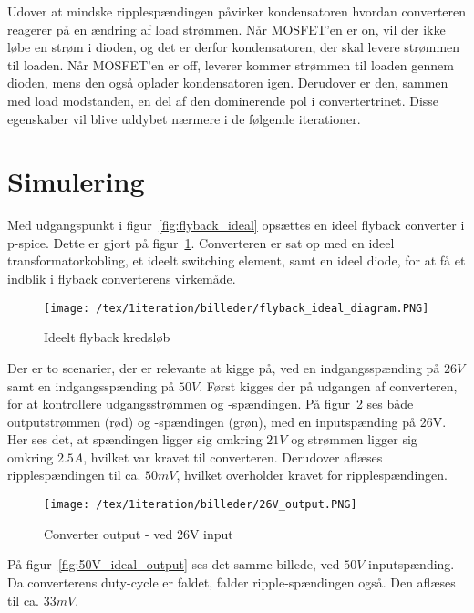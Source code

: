 \noindent Udover at mindske ripplespændingen påvirker kondensatoren hvordan converteren reagerer på en ændring af load strømmen. Når MOSFET'en er on, vil der ikke løbe en strøm i dioden, og det er derfor kondensatoren, der skal levere strømmen til loaden. Når MOSFET'en er off, leverer kommer strømmen til loaden gennem dioden, mens den også oplader kondensatoren igen. Derudover er den, sammen med load modstanden, en del af den dominerende pol i convertertrinet. Disse egenskaber vil blive uddybet nærmere i de følgende iterationer. 

\section{Simulering}
Med udgangspunkt i figur~\ref{fig:flyback_ideal} opsættes en ideel flyback converter i p-spice. Dette er gjort på figur~\ref{fig:ideal_flyback_diagram}. Converteren er sat op med en ideel transformatorkobling, et ideelt switching element, samt en ideel diode, for at få et indblik i flyback converterens virkemåde. 


\begin{figure}[H]
	\center
	\texttt{[image: /tex/1iteration/billeder/flyback\_ideal\_diagram.PNG]}
	\caption{Ideelt flyback kredsløb}
	\label{fig:ideal_flyback_diagram}
\end{figure}

\noindent Der er to scenarier, der er relevante at kigge på, ved en indgangsspænding på $26V$ samt en indgangsspænding på $50V$. Først kigges der på udgangen af converteren, for at kontrollere udgangsstrømmen og -spændingen. På figur~\ref{fig:26V_ideal_output} ses både outputstrømmen (rød) og -spændingen (grøn), med en inputspænding på 26V. Her ses det, at spændingen ligger sig omkring $21V$ og strømmen ligger sig omkring $2.5A$, hvilket var kravet til converteren. Derudover aflæses ripplespændingen til ca. $50mV$, hvilket overholder kravet for ripplespændingen. 

\begin{figure}[H]
	\center
	\texttt{[image: /tex/1iteration/billeder/26V\_output.PNG]}
	\caption{Converter output - ved 26V input}
	\label{fig:26V_ideal_output}
\end{figure}

\noindent På figur~\ref{fig:50V_ideal_output} ses det samme billede, ved $50V$ inputspænding. Da converterens duty-cycle er faldet, falder ripple-spændingen også. Den aflæses til ca. $33mV$. 


